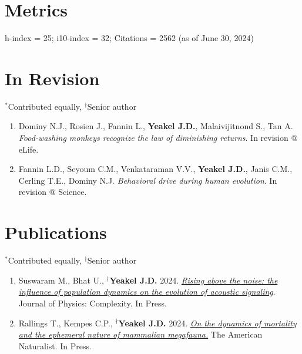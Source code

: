 \documentclass[margin,line,12pt]{res}
\newcommand\reverselabel[1]{%
  \def\theenumi{}%
  \renewcommand\makelabel{\makebox[\dimexpr\labelwidth-3pt\relax][r]{%
    \the\numexpr#1-\value{enumi}+1\relax}}}%
\begin{document}
\begin{resume}
\section{\sc Metrics}
h-index = 25; i10-index = 32; Citations = 2562 (as of June 30, 2024)





\section{\sc In Revision}
{\footnotesize{${}^\ast$Contributed equally, ${}^\dag$Senior author}}
\begin{enumerate}
  \reverselabel{43}
\item Dominy N.J., Rosien J., Fannin L., \textbf{Yeakel J.D.}, Malaivijitnond S., Tan A. \emph{Food-washing monkeys recognize the law of diminishing returns}. In revision @ eLife.
\item Fannin L.D., Seyoum C.M., Venkataraman V.V., \textbf{Yeakel J.D.}, Janis C.M., Cerling T.E., Dominy N.J. \emph{Behavioral drive during human evolution}. In revision @ Science.
\end{enumerate}


\section{\sc Publications}
{\footnotesize{${}^\ast$Contributed equally, ${}^\dag$Senior author}}
\begin{enumerate}
  \reverselabel{41}

\item Suswaram M., Bhat U., \textbf{${}^\dag$Yeakel J.D.} 2024. \href{https://iopscience.iop.org/article/10.1088/2632-072X/ad5e2e}{\emph{Rising above the noise: the influence of population dynamics on the evolution of acoustic signaling}}. Journal of Physics: Complexity. In Press.

\item Rallings T., Kempes C.P., \textbf{${}^\dag$Yeakel J.D.} 2024. \href{https://www.journals.uchicago.edu/doi/abs/10.1086/731331}{\emph{On the dynamics of mortality and the ephemeral nature of mammalian megafauna.}} The American Naturalist. In Press.


\end{enumerate}
\end{resume}
\end{document}
